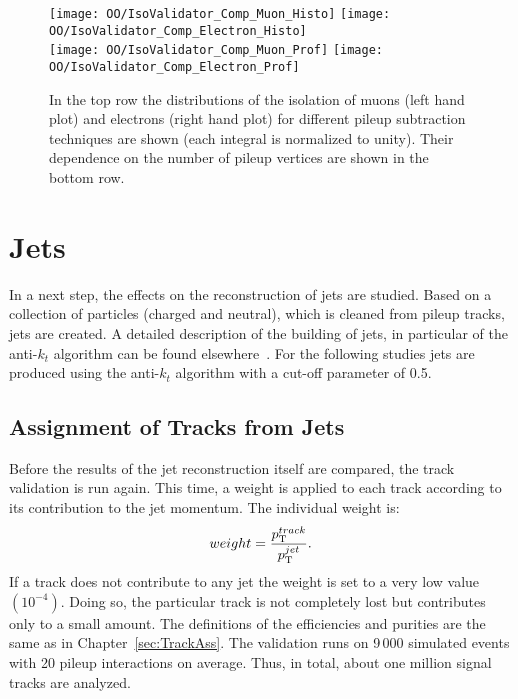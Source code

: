 \begin{figure}[h!t]
  \centering
  \texttt{[image: OO/IsoValidator\_Comp\_Muon\_Histo]}
  \texttt{[image: OO/IsoValidator\_Comp\_Electron\_Histo]}
  \\
  \texttt{[image: OO/IsoValidator\_Comp\_Muon\_Prof]}
  \texttt{[image: OO/IsoValidator\_Comp\_Electron\_Prof]}
  \caption[Distributions of the isolation of muons and electrons and their dependencies on the number of pileup vertices for different pileup subtraction techniques]{In the top row the distributions of the isolation of muons (left hand plot) and electrons (right hand plot) for different pileup subtraction techniques are shown (each integral is normalized to unity). Their dependence on the number of pileup vertices are shown in the bottom row. \label{plot:OOIsoComp}}
\end{figure}



\section{Jets \label{sec:OOJets}}

In a next step, the effects on the reconstruction of jets are studied. Based on a collection of particles (charged and neutral), which is cleaned from pileup tracks, jets are created. A detailed description of the building of jets, in particular of the anti-$k_{t}$ algorithm can be found elsewhere~\cite{Cacciari:2008gp}. For the following studies jets are produced using the anti-$k_{t}$ algorithm with a cut-off parameter of 0.5.

\subsection{Assignment of Tracks from Jets \label{sec:OOJetsTracks}}

Before the results of the jet reconstruction itself are compared, the track validation is run again. This time, a weight is applied to each track according to its contribution to the jet momentum. The individual weight is:
\begin{equation}
weight = \frac{ p_{\mathrm{T}}^{track} }{ p_{\mathrm{T}}^{jet} }.
\label{eq:OOJetWeight}
\end{equation}
If a track does not contribute to any jet the weight is set to a very low value $\left(10^{-4}\right)$. Doing so, the particular track is not completely lost but contributes only to a small amount. The definitions of the efficiencies and purities are the same as in Chapter~\ref{sec:TrackAss}. The validation runs on 9\,000 simulated \ttbar events with 20 pileup interactions on average. Thus, in total, about one million signal tracks are analyzed.

